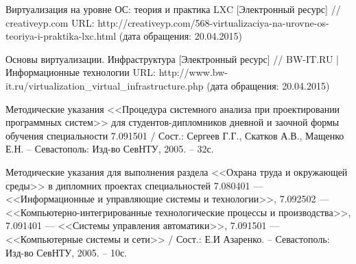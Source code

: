 \begin{thebibliography}{00}
    Виртуализация на уровне ОС: теория и практика LXC
    [Электронный ресурс] //
    creativeyp.com
    URL: http://creativeyp.com/568-virtualizaciya-na-urovne-os-teoriya-i-praktika-lxc.html
    (дата обращения: 20.04.2015)

    Основы виртуализации. Инфраструктура
    [Электронный ресурс] //
    BW-IT.RU | Информационные технологии
    URL: http://www.bw-it.ru/virtualization\_virtual\_infrastructure.php
    (дата обращения: 20.04.2015)

    Методические указания <<Процедура системного анализа при проектировании программных систем>>
    для студентов-дипломников дневной и заочной формы обучения специальности 7.091501 /
    Сост.: Сергеев Г.Г., Скатков А.В., Мащенко Е.Н. -- Севастополь:
    Изд-во СевНТУ, 2005. -- 32с.

    Методические указания для выполнения раздела <<Охрана труда и окружающей среды>>
    в дипломних проектах специальностей
    7.080401 --- <<Информационные и управляющие системы и технологии>>,
    7.092502 --- <<Компьютерно-интегрированные технологические процессы и производства>>,
    7.091401 --- <<Системы управления автоматики>>,
    7.091501 --- <<Компьютерные системы и сети>> / Сост.: Е.И Азаренко. -- Севастополь:
    Изд-во СевНТУ, 2005. -- 10с.

\end{thebibliography}
\endgroup

\clearpage
